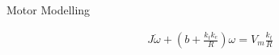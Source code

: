 \subsection{}
{
\begin{frame}{Motor Modelling}

	\vspace{-3mm}
   	\begin{figure}
 	\end{figure}


\begin{equation*}
\begin{split}
J \dot \omega + (b + \frac{ k_t k_e }{R} ) \omega = V_m \frac{k_t}{R}
\end{split}
\end{equation*}



\end{frame}
}





%
%
%
%
%
%
%
%
%
